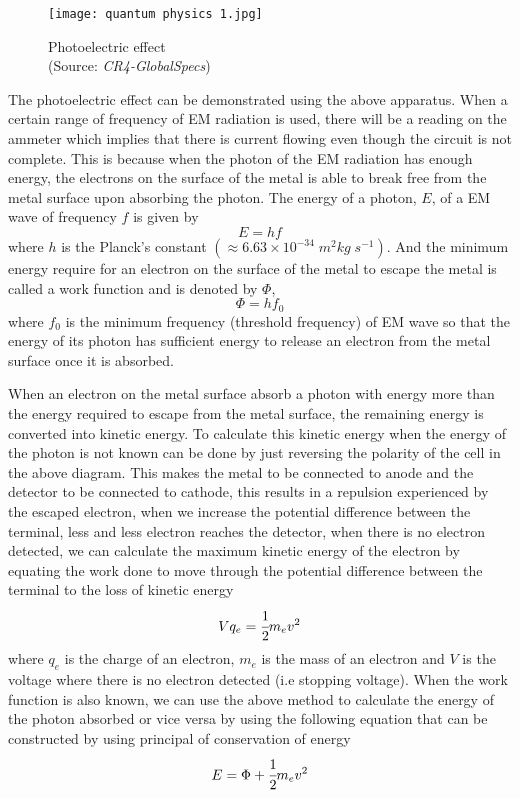 \documentclass{article}
\begin{document}
 
 \begin{figure}[H]
     \centering
     \captionsetup{justification=centering,margin=2cm}
     \texttt{[image: quantum physics 1.jpg]}
     \caption*{Photoelectric effect \\ (Source: \textit{CR4-GlobalSpecs})}
 \end{figure}
  The photoelectric effect can be demonstrated using the above apparatus. When a certain range of frequency of EM radiation is used, there will be a reading on the ammeter which implies that there is current flowing even though the circuit is not complete. This is because when the photon of the EM radiation has enough energy, the electrons on the surface of the metal is able to break free from the metal surface upon absorbing the photon. The energy of a photon, $E$, of a EM wave of frequency $f$  is given by 
  $$E=hf$$
where $h$ is the Planck's constant $(\approx 6.63 \times 10^{-34} \; m^2 kg \; s^{-1})$. And the minimum energy require for an electron on the surface of the metal to escape the metal is called a work function and is denoted by $\Phi$,
  $$\Phi=hf_0$$
where $f_0$ is the minimum frequency (threshold frequency) of EM wave so that the energy of its photon has sufficient energy to release an electron from the metal surface once it is absorbed.

When an electron on the metal surface absorb a photon with energy more than the energy required to escape from the metal surface, the remaining energy is converted into kinetic energy. To calculate this kinetic energy when the energy of the photon is not known can be done by just reversing the polarity of the cell in the above diagram. This makes the metal to be connected to anode and the detector to be connected to cathode, this results in a repulsion experienced by the escaped electron, when we increase the potential difference between the terminal, less and less electron reaches the detector, when there is no electron detected, we can calculate the maximum kinetic energy of the electron by equating the work done to move through the potential difference between the terminal to the loss of kinetic energy 
$$Vq_e=\cfrac{1}{2}m_ev^2$$
 where $q_e$ is the charge of an electron, $m_e$ is the mass of an electron and $V$ is the voltage where there is no electron detected (i.e stopping voltage). When the work function is also known, we can use the above method to calculate the energy of the photon absorbed or vice versa by using the following equation that can be constructed by using principal of conservation of energy
 $$E=\Phi + \cfrac{1}{2}m_ev^2$$
 
\end{document}
